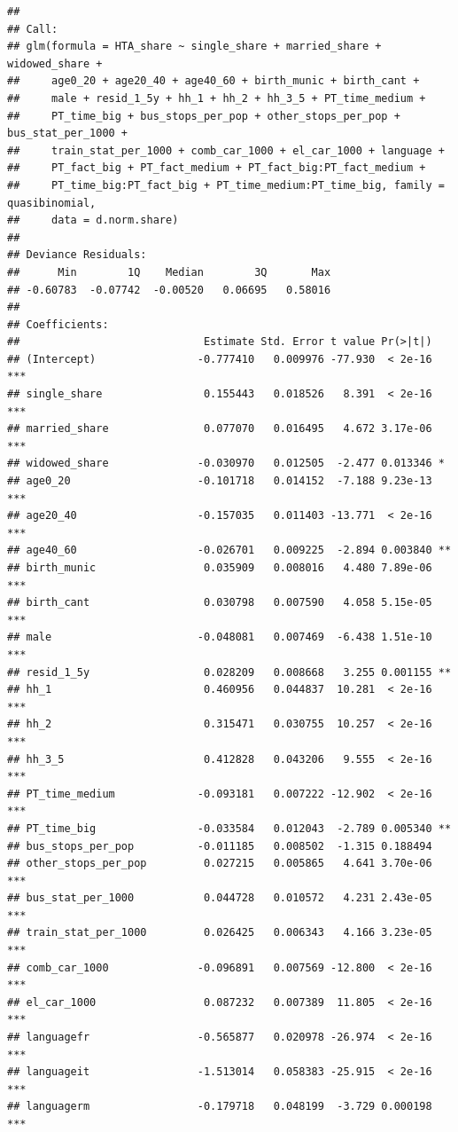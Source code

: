 \documentclass[
]{article}
\begin{document}
\begin{verbatim}
## 
## Call:
## glm(formula = HTA_share ~ single_share + married_share + widowed_share + 
##     age0_20 + age20_40 + age40_60 + birth_munic + birth_cant + 
##     male + resid_1_5y + hh_1 + hh_2 + hh_3_5 + PT_time_medium + 
##     PT_time_big + bus_stops_per_pop + other_stops_per_pop + bus_stat_per_1000 + 
##     train_stat_per_1000 + comb_car_1000 + el_car_1000 + language + 
##     PT_fact_big + PT_fact_medium + PT_fact_big:PT_fact_medium + 
##     PT_time_big:PT_fact_big + PT_time_medium:PT_time_big, family = quasibinomial, 
##     data = d.norm.share)
## 
## Deviance Residuals: 
##      Min        1Q    Median        3Q       Max  
## -0.60783  -0.07742  -0.00520   0.06695   0.58016  
## 
## Coefficients:
##                             Estimate Std. Error t value Pr(>|t|)    
## (Intercept)                -0.777410   0.009976 -77.930  < 2e-16 ***
## single_share                0.155443   0.018526   8.391  < 2e-16 ***
## married_share               0.077070   0.016495   4.672 3.17e-06 ***
## widowed_share              -0.030970   0.012505  -2.477 0.013346 *  
## age0_20                    -0.101718   0.014152  -7.188 9.23e-13 ***
## age20_40                   -0.157035   0.011403 -13.771  < 2e-16 ***
## age40_60                   -0.026701   0.009225  -2.894 0.003840 ** 
## birth_munic                 0.035909   0.008016   4.480 7.89e-06 ***
## birth_cant                  0.030798   0.007590   4.058 5.15e-05 ***
## male                       -0.048081   0.007469  -6.438 1.51e-10 ***
## resid_1_5y                  0.028209   0.008668   3.255 0.001155 ** 
## hh_1                        0.460956   0.044837  10.281  < 2e-16 ***
## hh_2                        0.315471   0.030755  10.257  < 2e-16 ***
## hh_3_5                      0.412828   0.043206   9.555  < 2e-16 ***
## PT_time_medium             -0.093181   0.007222 -12.902  < 2e-16 ***
## PT_time_big                -0.033584   0.012043  -2.789 0.005340 ** 
## bus_stops_per_pop          -0.011185   0.008502  -1.315 0.188494    
## other_stops_per_pop         0.027215   0.005865   4.641 3.70e-06 ***
## bus_stat_per_1000           0.044728   0.010572   4.231 2.43e-05 ***
## train_stat_per_1000         0.026425   0.006343   4.166 3.23e-05 ***
## comb_car_1000              -0.096891   0.007569 -12.800  < 2e-16 ***
## el_car_1000                 0.087232   0.007389  11.805  < 2e-16 ***
## languagefr                 -0.565877   0.020978 -26.974  < 2e-16 ***
## languageit                 -1.513014   0.058383 -25.915  < 2e-16 ***
## languagerm                 -0.179718   0.048199  -3.729 0.000198 ***

\end{verbatim}
\end{document}
